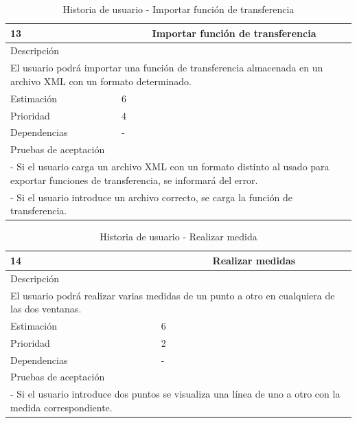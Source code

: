 \begin{table}[H]
	\begin{center}
		\begin{tabular} {|l|c|l|}
			\hline
			13 & \multicolumn{2}{c|}{Importar función de transferencia} \\ \hline \hline
			\multicolumn{3}{|l|}{Descripción} \\ \hline
			\multicolumn{3}{|p{12cm}|}{El usuario podrá importar una función de transferencia almacenada en un archivo XML con un formato determinado.} \\ \hline
			\multicolumn{2}{|l|}{Estimación} & 6 \\ \hline
			\multicolumn{2}{|l|}{Prioridad} & 4 \\ \hline
			\multicolumn{2}{|l|}{Dependencias} & - \\ \hline
			\multicolumn{3}{|l|}{Pruebas de aceptación} \\ \hline
			\multicolumn{3}{|p{12cm}|}{ - Si el usuario carga un archivo XML con un formato distinto al usado para exportar funciones de transferencia, se informará del error.} \\
			\multicolumn{3}{|p{12cm}|}{ - Si el usuario introduce un archivo correcto, se carga la función de transferencia.} \\ \hline
		\end{tabular}
	\end{center}
	\caption{Historia de usuario - Importar función de transferencia}
	\label{tab:hu_importar_funcion_de_transferencia}
\end{table}

\begin{table}[H]
	\begin{center}
		\begin{tabular} {|l|c|l|}
			\hline
			14 & \multicolumn{2}{c|}{Realizar medidas} \\ \hline \hline
			\multicolumn{3}{|l|}{Descripción} \\ \hline
			\multicolumn{3}{|p{12cm}|}{El usuario podrá realizar varias medidas de un punto a otro en cualquiera de las dos ventanas.} \\ \hline
			\multicolumn{2}{|l|}{Estimación} & 6 \\ \hline
			\multicolumn{2}{|l|}{Prioridad} & 2 \\ \hline
			\multicolumn{2}{|l|}{Dependencias} & - \\ \hline
			\multicolumn{3}{|l|}{Pruebas de aceptación} \\ \hline
			\multicolumn{3}{|p{12cm}|}{ - Si el usuario introduce dos puntos se visualiza una línea de uno a otro con la medida correspondiente.} \\ \hline
		\end{tabular}
	\end{center}
	\caption{Historia de usuario - Realizar medida}
	\label{tab:hu_realizar_medida}
\end{table}


